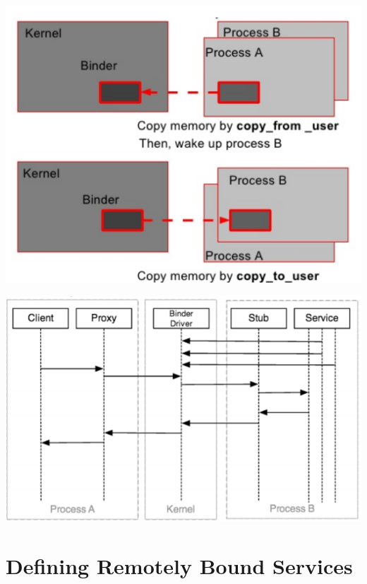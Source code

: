 \documentclass{article}
\begin{document}
\begin{center}
  \includegraphics[scale=0.5]{binder_transaction.png}
\end{center}
\begin{center}
  \includegraphics[scale=0.5]{binder_abstraction.png}
\end{center}

\pagebreak

\section{Defining Remotely Bound Services}
\end{document}
